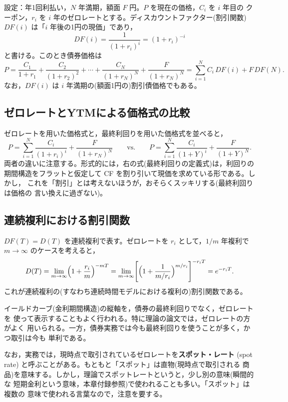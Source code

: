 設定：年1回利払い，$N$ 年満期，額面 $F$ 円。$P$ を現在の価格，$C_i$ を $i$ 年目の
クーポン，$r_i$ を $i$ 年のゼロレートとする。ディスカウントファクター(割引関数)
$DF(i)$ は「$i$ 年後の1円の現価」であり，
\begin{equation}
DF(i) = \frac{1}{(1+r_i)^i} = (1+r_i)^{-i}
\label{eq:df-zero}
\end{equation}
と書ける。このとき債券価格は
\begin{equation}
P = \frac{C_1}{1+r_1} + \frac{C_2}{(1+r_2)^2} + \cdots + \frac{C_N}{(1+r_N)^N}
+ \frac{F}{(1+r_N)^N}
= \sum_{i=1}^{N} C_i\,DF(i) + F\,DF(N).
\label{eq:price-zero}
\end{equation}
なお，$DF(i)$ は $i$ 年満期の(額面1円の)割引債価格でもある。

\subsection{ゼロレートとYTMによる価格式の比較}

ゼロレートを用いた価格式と，最終利回りを用いた価格式を並べると，
\[
P = \sum_{i=1}^{N}\frac{C_i}{(1+r_i)^i} + \frac{F}{(1+r_N)^N}
\qquad\text{vs.}\qquad
P = \sum_{i=1}^{N}\frac{C_i}{(1+Y)^i} + \frac{F}{(1+Y)^N}.
\]
両者の違いに注意する。形式的には，右の式(最終利回りの定義式)は，利回りの
期間構造をフラットと仮定して CF を割り引いて現価を求めている形である。しかし，
これを「割引」とは考えないほうが，おそらくスッキリする(最終利回りは価格の
言い換えに過ぎない)。

\subsection{連続複利における割引関数}

$DF(T) = D(T)$ を連続複利で表す。ゼロレートを $r_i$ として，$1/m$ 年複利で
$m\to\infty$ のケースを考えると，
\begin{equation}
D(T) = \lim_{m\to\infty}\Bigl(1+\frac{r_i}{m}\Bigr)^{-mT}
= \lim_{m\to\infty}\Biggl[\Bigl(1+\frac{1}{m/r_i}\Bigr)^{m/r_i}\Biggr]^{-r_i T}
= e^{-r_i T}.
\label{eq:df-cont}
\end{equation}
これが連続複利の(すなわち連続時間モデルにおける複利の)割引関数である。

\begin{remark}
イールドカーブ(金利期間構造)の縦軸を，債券の最終利回りでなく，ゼロレートを
使って表示することもよく行われる。特に理論の論文では，ゼロレートの方がよく
用いられる。一方，債券実務では今も最終利回りを使うことが多く，かつ取引は今も
単利である。

なお，実務では，現時点で取引されているゼロレートを\textbf{スポット・レート}
(spot rate) と呼ぶことがある。もともと「スポット」は直物(現時点で取引される
商品)を意味する。しかし，理論でスポットレートというと，少し別の意味(瞬間的な
短期金利という意味，本章付録参照)で使われることも多い。「スポット」は複数の
意味で使われる言葉なので，注意を要する。
\end{remark}

